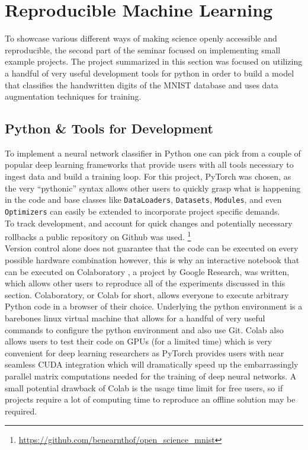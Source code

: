 \documentclass{article}
\begin{document}
\section{Reproducible Machine Learning}\label{secmnist}
To showcase various different ways of making science openly accessible and reproducible, the second part of the seminar focused on implementing small example projects. The project summarized in this section was focused on utilizing a handful of very useful development tools for python in order to build a model that classifies the handwritten digits of the MNIST database \cite{mnist} and uses data augmentation techniques for training. 
\subsection{Python \& Tools for Development}
To implement a neural network classifier in Python one can pick from a couple of popular deep learning frameworks that provide users with all tools necessary to ingest data and build a training loop. For this project, PyTorch was chosen, as the very ``pythonic'' syntax allows other users to quickly grasp what is happening in the code and base classes like \texttt{DataLoaders}, \texttt{Datasets}, \texttt{Modules}, and even \texttt{Optimizers} can easily be extended to incorporate project specific demands. \\
To track development, and account for quick changes and potentially necessary rollbacks a public repository on Github was used. \footnote{\url{https://github.com/benearnthof/open\_science\_mnist}}\\
Version control alone does not guarantee that the code can be executed on every possible hardware combination however, this is why an interactive notebook that can be executed on Colaboratory \cite{colab}, a project by Google Research, was written, which allows other users to reproduce all of the experiments discussed in this section. Colaboratory, or Colab for short, allows everyone to execute arbitrary Python code in a browser of their choice. Underlying the python environment is a barebones linux virtual machine that allows for a handful of very useful commands to configure the python environment and also use Git. Colab also allows users to test their code on GPUs (for a limited time) which is very convenient for deep learning researchers as PyTorch provides users with near seamless CUDA integration which will dramatically speed up the embarrassingly  parallel matrix computations needed for the training of deep neural networks. A small potential drawback of Colab is the usage time limit for free users, so if projects require a lot of computing time to reproduce an offline solution may be required. \\
\end{document}
